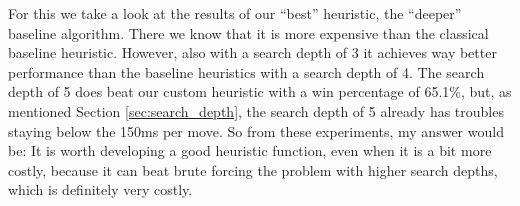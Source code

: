 \documentclass[aps,prd,notitlepage,floatfix,superscriptaddress,groupedaddress,nofootinbib]{revtex4-1}
\begin{document}
For this we take a look at the results of our ``best'' heuristic, the ``deeper'' baseline algorithm. There we know that it is more expensive than the classical baseline heuristic. However, also with a search depth of 3 it achieves way better performance than the baseline heuristics with a search depth of 4. The search depth of 5 does beat our custom heuristic with a win percentage of 65.1\%, but, as mentioned Section \ref{sec:search_depth}, the search depth of 5 already has troubles staying below the 150ms per move. So from these experiments, my answer would be: It is worth developing a good heuristic function, even when it is a bit more costly, because it can beat brute forcing the problem with higher search depths, which is definitely very costly.




%

\end{document}
